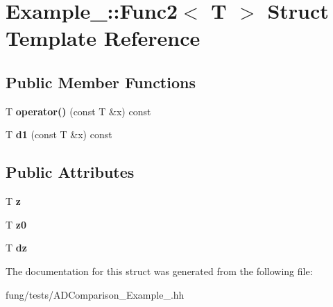 \hypertarget{structExample__2_1_1Func2}{\section{Example\-\_\-:\-:Func2$<$ T $>$ Struct Template Reference}
\label{structExample__2_1_1Func2}
}
\subsection*{Public Member Functions}
\begin{DoxyCompactItemize}
\item 
\hypertarget{structExample__2_1_1Func2_ab3d98c7fafa67853727a8048b194f7e9}{T {\bfseries operator()} (const T \&x) const }\label{structExample__2_1_1Func2_ab3d98c7fafa67853727a8048b194f7e9}

\item 
\hypertarget{structExample__2_1_1Func2_a609b6cd3bde26809f68ea8154ce8f9d3}{T {\bfseries d1} (const T \&x) const }\label{structExample__2_1_1Func2_a609b6cd3bde26809f68ea8154ce8f9d3}

\end{DoxyCompactItemize}
\subsection*{Public Attributes}
\begin{DoxyCompactItemize}
\item 
\hypertarget{structExample__2_1_1Func2_a670adef09fca247b1a1cc6718af36ac1}{T {\bfseries z}}\label{structExample__2_1_1Func2_a670adef09fca247b1a1cc6718af36ac1}

\item 
\hypertarget{structExample__2_1_1Func2_a1d9a5e00966585b5edac315223eff981}{T {\bfseries z0}}\label{structExample__2_1_1Func2_a1d9a5e00966585b5edac315223eff981}

\item 
\hypertarget{structExample__2_1_1Func2_abe4e349c63bc625c33da6a8fb6df1498}{T {\bfseries dz}}\label{structExample__2_1_1Func2_abe4e349c63bc625c33da6a8fb6df1498}

\end{DoxyCompactItemize}


The documentation for this struct was generated from the following file\-:\begin{DoxyCompactItemize}
\item 
fung/tests/A\-D\-Comparison\-\_\-\-Example\-\_.\-hh\end{DoxyCompactItemize}
